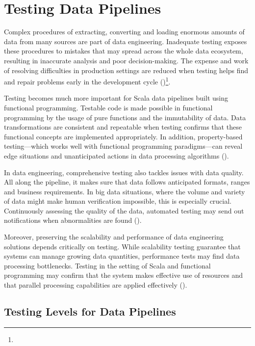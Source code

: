 \chapter{Testing Data Pipelines}

Complex procedures of extracting, converting and loading enormous amounts of data from many sources are part of data engineering. Inadequate testing exposes these procedures to mistakes that may spread across the whole data ecosystem, resulting in inaccurate analysis and poor decision-making. The expense and work of resolving difficulties in production settings are reduced when testing helps find and repair problems early in the development cycle (\cite{punnTestingBigData2019})\footnote[38]{}.

Testing becomes much more important for Scala data pipelines built using functional programming. Testable code is made possible in functional programming by the usage of pure functions and the immutability of data. Data transformations are consistent and repeatable when testing confirms that these functional concepts are implemented appropriately. In addition, property-based testing—which works well with functional programming paradigms—can reveal edge situations and unanticipated actions in data processing algorithms (\cite{punnTestingBigData2019})\footnotemark[38].

In data engineering, comprehensive testing also tackles issues with data quality. All along the pipeline, it makes sure that data follows anticipated formats, ranges and business requirements. In big data situations, where the volume and variety of data might make human verification impossible, this is especially crucial. Continuously assessing the quality of the data, automated testing may send out notifications when abnormalities are found (\cite{punnTestingBigData2019})\footnotemark[38].

Moreover, preserving the scalability and performance of data engineering solutions depends critically on testing. While scalability testing guarantee that systems can manage growing data quantities, performance tests may find data processing bottlenecks. Testing in the setting of Scala and functional programming may confirm that the system makes effective use of resources and that parallel processing capabilities are applied effectively (\cite{punnTestingBigData2019})\footnotemark[38].

\section{Testing Levels for Data Pipelines}

